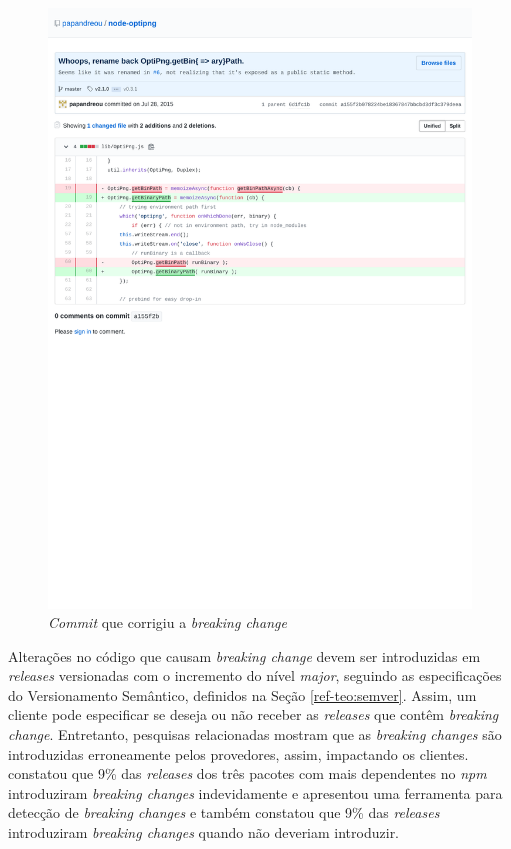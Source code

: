 \begin{figure}
    \centering
    \includegraphics[scale=0.65]{figuras/bc_example.pdf}
    \caption{\textit{Commit} que corrigiu a \textit{breaking change}}
    \label{fig:bc_optipng}
\end{figure}{}

Alterações no código que causam \textit{breaking change} devem ser introduzidas em \textit{releases} versionadas com o incremento do nível \textit{major}, seguindo as especificações do Versionamento Semântico, definidos na Seção \ref{ref-teo:semver}. Assim, um cliente pode especificar se deseja ou não receber as \textit{releases} que contêm \textit{breaking change}. Entretanto, pesquisas relacionadas mostram que as \textit{breaking changes} são introduzidas erroneamente pelos provedores, assim, impactando os clientes.  constatou que 9\% das \textit{releases} dos três pacotes com mais dependentes no \textit{npm} introduziram \textit{breaking changes} indevidamente e  apresentou uma ferramenta para detecção de \textit{breaking changes} e também constatou que 9\% das \textit{releases} introduziram \textit{breaking changes} quando não deveriam introduzir.

